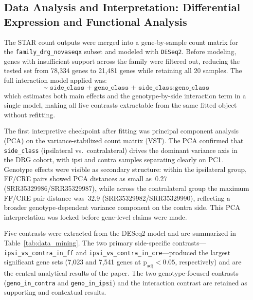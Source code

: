 \documentclass[12pt]{article}
\begin{document}
\subsection{Data Analysis and Interpretation: Differential Expression and Functional Analysis}

The STAR count outputs were merged into a gene-by-sample count matrix for the
\texttt{family\_drg\_novaseqx} subset and modeled with \texttt{DESeq2}.
Before modeling, genes with insufficient support across the family were filtered out,
reducing the tested set from 78{,}334 genes to 21{,}481 genes while retaining all 20 samples.
The full interaction model applied was:
\[ \texttt{\textasciitilde{}\ side\_class + geno\_class + side\_class{:}geno\_class} \]
which estimates both main effects and the genotype-by-side interaction term in a single model,
making all five contrasts extractable from the same fitted object without refitting.

The first interpretive checkpoint after fitting was principal component analysis (PCA) on the
variance-stabilized count matrix (VST).
The PCA confirmed that \texttt{side\_class} (ipsilateral vs.\ contralateral) drives the
dominant variance axis in the DRG cohort, with ipsi and contra samples separating clearly on
PC1.
Genotype effects were visible as secondary structure: within the ipsilateral group, FF/CRE
pairs showed PCA distances as small as~0.27 (SRR35329986/SRR35329987), while across the
contralateral group the maximum FF/CRE pair distance was~32.9
(SRR35329982/SRR35329990), reflecting a broader genotype-dependent variance component on the
contra side.
This PCA interpretation was locked before gene-level claims were made.

Five contrasts were extracted from the DESeq2 model and are summarized in
Table~\ref{tab:data_mining}.
The two primary side-specific contrasts---\texttt{ipsi\_vs\_contra\_in\_ff} and
\texttt{ipsi\_vs\_contra\_in\_cre}---produced the largest significant gene sets (7{,}023 and
7{,}541 genes at $\text{p}_{\text{adj}} < 0.05$, respectively) and are the central analytical
results of the paper.
The two genotype-focused contrasts (\texttt{geno\_in\_contra} and \texttt{geno\_in\_ipsi}) and
the interaction contrast are retained as supporting and contextual results.
\end{document}
